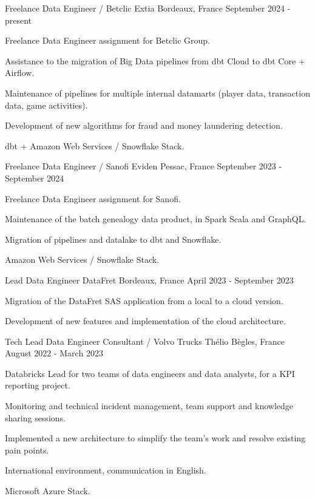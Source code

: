 
\begin{cventries}
	\cventry
	{Freelance Data Engineer / Betclic}
	{Extia}
	{Bordeaux, France}
	{September 2024 - present}
	{
		\begin{cvitems}
			\item {Freelance Data Engineer assignment for Betclic Group.}
			\item {Assistance to the migration of Big Data pipelines from dbt Cloud to dbt Core + Airflow.}
			\item {Maintenance of pipelines for multiple internal datamarts (player data, transaction data, game activities).}
			\item {Development of new algorithms for fraud and money laundering detection.}
			\item {dbt + Amazon Web Services / Snowflake Stack.}
		\end{cvitems}
	}
	
	\cventry
	{Freelance Data Engineer / Sanofi}
	{Eviden}
	{Pessac, France}
	{September 2023 - September 2024}
	{
		\begin{cvitems}
			\item {Freelance Data Engineer assignment for Sanofi.}
			\item {Maintenance of the batch genealogy data product, in Spark Scala and GraphQL.}
			\item {Migration of pipelines and datalake to dbt and Snowflake.}
			\item {Amazon Web Services / Snowflake Stack.}
		\end{cvitems}
	}

	\cventry
	{Lead Data Engineer}
	{DataFret}
	{Bordeaux, France}
	{April 2023 - September 2023}
	{
		\begin{cvitems}
			\item {Migration of the DataFret SAS application from a local to a cloud version.}
			\item {Development of new features and implementation of the cloud architecture.}
		\end{cvitems}
	}
	
	\cventry
	{Tech Lead Data Engineer Consultant / Volvo Trucks}
	{Thélio}
	{Bègles, France}
	{August 2022 - March 2023}
	{
		\begin{cvitems}
			\item Databricks Lead for two teams of data engineers and data analysts, for a KPI reporting project.
			\item Monitoring and technical incident management, team support and knowledge sharing sessions.
			\item Implemented a new architecture to simplify the team's work and resolve existing pain points.
			\item International environment, communication in English.
			\item Microsoft Azure Stack.
		\end{cvitems}
	}
	

\end{cventries}
